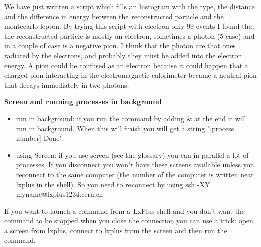 We have just written a script which fills an histogram with the type, the distance and the difference in energy between the reconstructed particle and the montecarlo lepton.
By trying this script with electron only 99 events I found that the reconstructed particle is mostly an electron, sometimes a photon (5 case) and in a couple of case is a negative pion. I think that the photon are that ones radiated by the electrons, and probably they must be added into the electron energy. A pion could be confused as an electron because it could happen that a charged pion interacting in the electromagnetic calorimeter became a neutral pion that decays immediately in two photons.

\textbf{Screen and running processes in background}

\begin{itemize}
\item run in background: if you run the command by adding \& at the end it will run in background. When this will finish you will get a string "[process number] Done".
\item using Screen: if you use screen (see the glossary) you can in parallel a lot of processes. If you disconnect you won't have these screens available unless you reconnect to the same computer (the number of the computer is written near lxplus in the shell). So you need to reconnect by using ssh -XY myname@lxplus1234.cern.ch 
\end{itemize}

If you want to launch a command from a LxPlus shell and you don't want the command to be stopped when you close the connection you can use a trick: open a screen from lxplus, connect to lxplus from the screen and then run the command.

